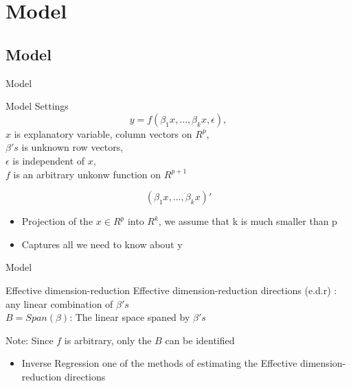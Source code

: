 \documentclass[ignorenonframetext,]{beamer}
\providecommand{\tightlist}{%
  \setlength{\itemsep}{0pt}\setlength{\parskip}{0pt}}
\begin{document}
\section{Model}\label{model}

\subsection{Model}\label{model-1}

\begin{frame}{Model}

\begin{block}{Model Settings}
\[
  y = f(\beta_1x, \dots, \beta_kx, \epsilon),
\]
$x$ is explanatory variable, column vectors on $R^p$,\\   
$\beta's$ is unknown row vectors, \\
$\epsilon$ is independent of $x$, \\
$f$ is an arbitrary unkonw function on $R^{p+1}$ \\
\end{block}

\[ (\beta_1x, \dots, \beta_kx)' \]

\begin{itemize}
\tightlist
\item
  Projection of the \(x\in R^p\) into \(R^k\), we assume that k is much
  smaller than p
\item
  Captures all we need to know about y
\end{itemize}

\end{frame}

\begin{frame}{Model}

\begin{block}{Effective dimension-reduction}
Effective dimension-reduction directions (e.d.r) : any linear combination of $\beta's$ \\
$B = Span(\beta)$: The linear space spaned by $\beta's$\\
\end{block}

Note: Since \(f\) is arbitrary, only the \(B\) can be identified

\begin{itemize}
\tightlist
\item
  Inverse Regression one of the methods of estimating the Effective
  dimension-reduction directions
\end{itemize}

\end{frame}
\end{document}
